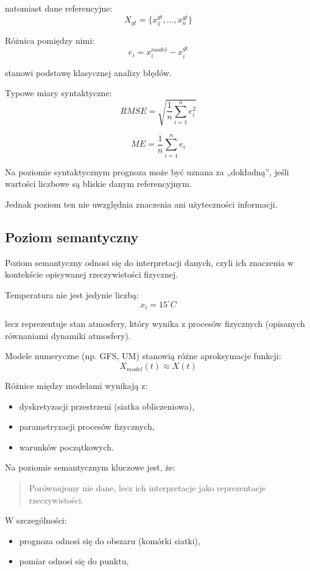 \documentclass[a4paper,12pt]{article}
\begin{document}
natomiast dane referencyjne:
\[
X_{gt} = \{x^{gt}_1, ..., x^{gt}_n\}
\]

Różnica pomiędzy nimi:
\[
e_i = x^{model}_i - x^{gt}_i
\]

stanowi podstawę klasycznej analizy błędów.

Typowe miary syntaktyczne:
\[
RMSE = \sqrt{\frac{1}{n}\sum_{i=1}^{n} e_i^2}
\]

\[
ME = \frac{1}{n}\sum_{i=1}^{n} e_i
\]

Na poziomie syntaktycznym prognoza może być uznana za „dokładną”,
jeśli wartości liczbowe są bliskie danym referencyjnym.

Jednak poziom ten nie uwzględnia znaczenia ani użyteczności informacji.

\subsection{Poziom semantyczny}

Poziom semantyczny odnosi się do interpretacji danych, czyli ich znaczenia
w kontekście opisywanej rzeczywistości fizycznej.

Temperatura nie jest jedynie liczbą:
\[
x_i = 15^\circ C
\]

lecz reprezentuje stan atmosfery, który wynika z procesów fizycznych
(opisanych równaniami dynamiki atmosfery).

Modele numeryczne (np. GFS, UM) stanowią różne aproksymacje funkcji:
\[
X_{model}(t) \approx X(t)
\]

Różnice między modelami wynikają z:
\begin{itemize}
    \item dyskretyzacji przestrzeni (siatka obliczeniowa),
    \item parametryzacji procesów fizycznych,
    \item warunków początkowych.
\end{itemize}

Na poziomie semantycznym kluczowe jest, że:

\begin{quote}
Porównujemy nie dane, lecz ich interpretacje jako reprezentacje rzeczywistości.
\end{quote}

W szczególności:
\begin{itemize}
    \item prognoza odnosi się do obszaru (komórki siatki),
    \item pomiar odnosi się do punktu,
\end{itemize}
\end{document}
